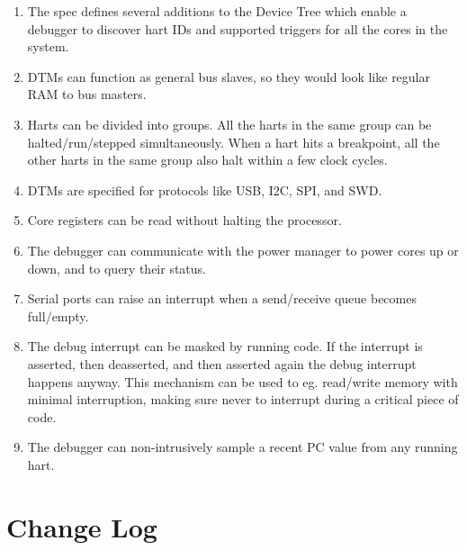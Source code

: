 \documentclass{article}
\begin{document}
\begin{enumerate}
   \item The spec defines several additions to the Device Tree which enable a
      debugger to discover hart IDs and supported triggers for all the cores
      in the system.
   \item DTMs can function as general bus slaves, so they would look like
      regular RAM to bus masters.
   \item Harts can be divided into groups. All the harts in the same group can
      be halted/run/stepped simultaneously. When a hart hits a breakpoint, all
      the other harts in the same group also halt within a few clock cycles.
   \item DTMs are specified for protocols like USB, I2C, SPI, and SWD.
   \item Core registers can be read without halting the processor.
   \item The debugger can communicate with the power manager to power cores up
      or down, and to query their status.
   \item Serial ports can raise an interrupt when a send/receive queue becomes full/empty.
   \item The debug interrupt can be masked by running code. If the interrupt is
      asserted, then deasserted, and then asserted again the debug interrupt
      happens anyway. This mechanism can be used to eg. read/write memory with
      minimal interruption, making sure never to interrupt during a critical
      piece of code.
   \item The debugger can non-intrusively sample a recent PC value from any
      running hart.
\end{enumerate}

\section{Change Log}
\end{document}
